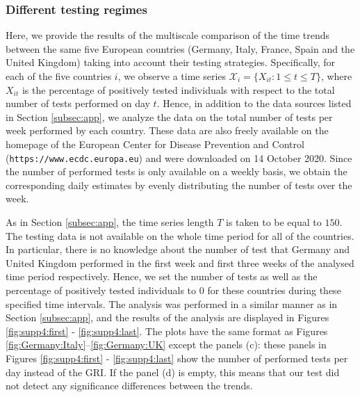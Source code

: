 \documentclass[a4paper,12pt]{article}
\numberwithin{equation}{section}
\begin{document}
\clearpage
\subsubsection{Different testing regimes}\label{s:subsec:app:4}


Here, we provide the results of the multiscale comparison of the time trends between the same five European countries (Germany, Italy, France, Spain and the United Kingdom) taking into account their testing strategies. Specifically, for each of the five countries $i$, we observe a time series $\mathcal{X}_i = \{ X_{it}: 1 \le t \le T \}$, where $X_{it}$ is the percentage of positively tested individuals with respect to the total number of tests performed on day $t$. Hence, in addition to the data sources listed in Section \ref{subsec:app}, we analyze the data on the total number of tests per week performed by each country. These data are also freely available on the homepage of the European Center for Disease Prevention and Control (\texttt{https://www.ecdc.europa.eu}) and were downloaded on 14 October 2020. Since the number of performed tests is only available on a weekly basis, we obtain the corresponding daily estimates by evenly distributing the number of tests over the week. 

As in Section \ref{subsec:app}, the time series length $T$ is taken to be equal to $150$. The testing data is not available on the whole time period for all of the countries. In particular, there is no knowledge about the number of test that Germany and United Kingdom performed in the first week and first three weeks of the analysed time period respectively. Hence, we set the number of tests as well as the percentage of positively tested individuals to $0$ for these countries during these specified time intervals. The analysis was performed in a similar manner as in Section \ref{subsec:app}, and the results of the analysis are displayed in Figures \ref{fig:supp4:first} - \ref{fig:supp4:last}. The plots have the same format as Figures \ref{fig:Germany:Italy}--\ref{fig:Germany:UK} except the panels (c): these panels in Figures \ref{fig:supp4:first} - \ref{fig:supp4:last} show the number of performed tests per day instead of the GRI. If the panel (d) is empty, this means that our test did not detect any significance differences between the trends.
\end{document}
